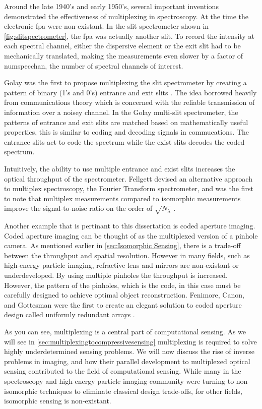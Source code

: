Around the late 1940's and early 1950's, several important inventions demonstrated the effectiveness of multiplexing in spectroscopy. At the time the electronic \gls{fpa} were non-existant. In the slit spectrometer shown in \ref{fig:slitspectrometer}, the \gls{fpa} was actually another slit. To record the intensity at each spectral channel, either the dispersive element or the exit slit had to be mechanically translated, making the measurements even slower by a factor of \gls{numspecchan}, the number of spectral channels of interest. 

Golay was the first to propose multiplexing the slit spectrometer by creating a pattern of binary (1's and 0's) entrance and exit slits \cite{golay1949multi}. The idea borrowed heavily from communications theory which is concerned with the reliable transmission of information over a noisey channel. In the Golay multi-slit spectrometer, the patterns of entrance and exit slits are matched based on mathematically useful properties, this is similar to coding and decoding signals in commucations. The entrance slits act to code the spectrum while the exist slits decodes the coded spectrum. 

Intuitively, the ability to use multiple entrance and exist slits increases the optical throughput of the spectrometer. Fellgett devised an alternative approach to multiplex spectroscopy, the Fourier Transform spectrometer, and was the first to note that multiplex measurements compared to isomorphic measurements improve the signal-to-noise ratio on the order of $ \sqrt{N_{\lambda}}$ \cite{fellgett1958principes}. 

Another example that is pertinant to this dissertation is coded aperture imaging. Coded aperture imaging can be thought of as the multiplexed version of a pinhole camera. As mentioned earlier in \autoref{sec:Isomorphic Sensing}, there is a trade-off between the throughput and spatial resolution. However in many fields, such as high-energy particle imaging, refractive lens and mirrors are non-existant or underdeveloped. By using multiple pinholes the throughput is increased. However, the pattern of the pinholes, which is the code, in this case must be carefully designed to achieve optimal object reconstruction. Fenimore, Canon, and Gottesman were the first to create an elegant solution to coded aperture design called uniformly redundant arrays \cite{fenimore1978coded, gottesman1989new}.

As you can see, multiplexing is a central part of computational sensing. As we will see in \autoref{sec:multiplexingtocompressivesensing} multiplexing is required to solve highly underdetermined sensing problems. We will now discuss the rise of inverse problems in imaging, and how their parallel development to multiplexed optical sensing contributed to the field of computational sensing. While many in the spectroscopy and high-energy particle imaging community were turning to non-isomorphic techniques to eliminate classical design trade-offs, for other fields, isomorphic sensing is non-existant.  

